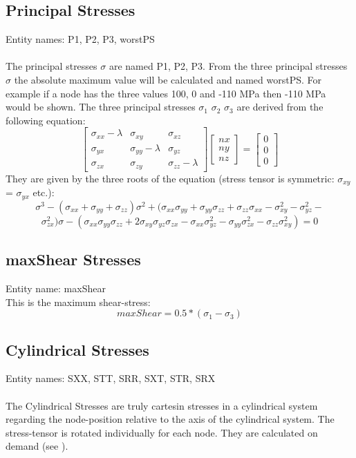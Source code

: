 \documentclass{article}
\begin{document}
\subsection{\label{Principal Stresses}Principal Stresses}
Entity names: P1, P2, P3, worstPS\\\\
The principal stresses $\sigma$ are named P1, P2, P3. From the three principal stresses $\sigma$ the absolute maximum value will be calculated and named worstPS. For example if a node has the three values 100, 0 and -110 MPa then -110 MPa would be shown. The three principal stresses $\sigma_{1}$ $\sigma_{2}$ $\sigma_{3}$ are derived from the following equation:
\[
\left [
\begin{array}{ccc}
\sigma_{xx}-\lambda & \sigma_{xy} & \sigma_{xz}\\
\sigma_{yx} & \sigma_{yy}-\lambda & \sigma_{yz}\\
\sigma_{zx} & \sigma_{zy} & \sigma_{zz}-\lambda
\end{array}
\right ]
\left [
\begin{array}{c}
nx\\
ny\\
nz
\end{array}
\right ]
= 
\left [
\begin{array}{c}
0\\
0\\
0
\end{array}
\right ]
\]
They are given by the three roots of the equation (stress tensor is symmetric: $\sigma_{xy}$ = $\sigma_{yx}$ etc.):
\[ \sigma^3 - (\sigma_{xx}+\sigma_{yy}+\sigma_{zz})\sigma^2 + (\sigma_{xx}\sigma_{yy}+\sigma_{yy}\sigma_{zz}+\sigma_{zz}\sigma_{xx}-\sigma_{xy}^2-\sigma_{yz}^2-\]\[\sigma_{zx}^2)\sigma - (\sigma_{xx}\sigma_{yy}\sigma_{zz}+2\sigma_{xy}\sigma_{yz}\sigma_{zx}-\sigma_{xx}\sigma_{yz}^2-\sigma_{yy}\sigma_{zx}^2-\sigma_{zz}\sigma_{xy}^2)  = 0 \]

\subsection{\label{maxShear Stress}maxShear Stresses}
Entity name: maxShear\\
This is the maximum shear-stress:
\[ maxShear = 0.5 * (\sigma_{1} - \sigma_{3}) \]

\subsection{\label{Cylindrical Stresses}Cylindrical Stresses}
Entity names: SXX, STT, SRR, SXT, STR, SRX\\\\
The Cylindrical Stresses are truly cartesin stresses in a cylindrical system regarding the node-position relative to the axis of the cylindrical system. The stress-tensor is rotated individually for each node. They are calculated on demand (see ).
\end{document}
